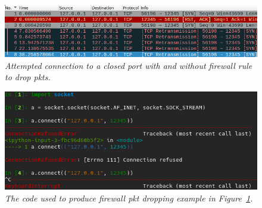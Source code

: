 \documentclass[titlepage]{article}
\begin{document}
\begin{figure}[H]
  \centering
  \includegraphics[width=\textwidth]{packet_drop.png}
  \caption{\textit{%
    Attempted connection to a closed port with and without firewall rule to drop \glspl{pkt}.
}}\label{firewall}
\end{figure}

\begin{figure}[H]
  \centering
  \includegraphics[width=\textwidth]{packet_drop_code.png}
  \caption{\textit{%
    The code used to produce firewall \gls{pkt} dropping example in Figure~\ref{firewall}.
}}\label{firewall_code}
\end{figure}
\end{document}
